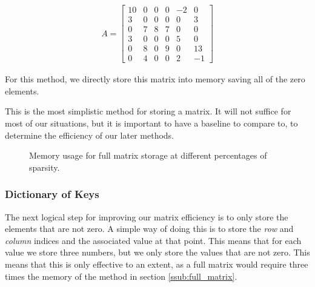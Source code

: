 \documentclass[../fem.tex]{subfile}
\begin{document}
\begin{align*}
  A = \begin{bmatrix}
    10 & 0 & 0 & 0 & -2 & 0 \\
    3 & 0 & 0 & 0 & 0 & 3 \\
    0 & 7 & 8 & 7 & 0 & 0 \\
    3 & 0 & 0 & 0 & 5 & 0 \\
    0 & 8 & 0 & 9 & 0 & 13 \\
    0 & 4 & 0 & 0 & 2 & -1
  \end{bmatrix}
\end{align*}

For this method, we directly store this matrix into memory saving all of the
zero elements.

This is the most simplistic method for storing a matrix. It will not suffice
for most of our situations, but it is important to have a baseline to compare
to, to determine the efficiency of our later methods.

\begin{figure}[htpb]
  \caption{Memory usage for full matrix storage at different
  percentages of sparsity.}
  \label{fig:mat_full}
\end{figure}

\subsubsection{Dictionary of Keys}%
\label{ssub:dictionary_of_keys}

The next logical step for improving our matrix efficiency is to only store the
elements that are not zero. A simple way of doing this is to store the
\textit{row} and \textit{column} indices and the associated value at that
point. This means that for each value we store three numbers, but we only store
the values that are not zero. This means that this is only effective to an
extent, as a full matrix would require three times the memory of the method in
section \ref{ssub:full_matrix}.
\end{document}
